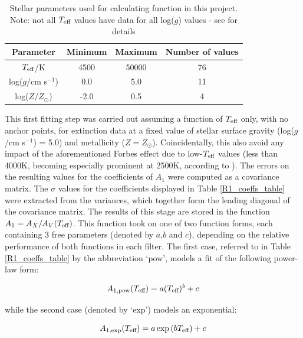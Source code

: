 \documentclass[12pt, a4paper]{report}
\begin{document}
\begin{table}
\begin{tabular}{cccc}
\hline
Parameter & Minimum & Maximum & Number of values\\
\hline
$T_{\textnormal{eff}}$/K & 4500 & 50000 & 76 \\
log($g$/cm s$^{-1}$) & 0.0 & 5.0 & 11 \\
log($Z/Z_{\odot}$) & -2.0 & 0.5 & 4 \\
\hline

\end{tabular}
\caption{Stellar parameters used for calculating function in this project. Note: not all $T_{\textnormal{eff}}$ values have data for all log($g$) values - see \cite{2004astro.ph..5087C} for details}
\label{param_range_table}
\end{table}

This first fitting step was carried out assuming a function of $T_{\textnormal{eff}}$ only, with no anchor points, for  extinction data at a fixed value of stellar surface gravity (log($g$/cm s$^{-1}$) = 5.0) and metallicity ($Z = Z_{\odot}$). Coincidentally, this also avoid any impact of the aforementioned Forbes effect due to low-$T_{\textnormal{eff}}$ values (less than 4000K, becoming especially prominent at 2500K, according to \cite{2008PASP..120..583G}). The errors on the resulting values for the coefficients of $A_{1}$ were computed as a covariance matrix. The $\sigma$ values for the coefficients displayed in Table \ref{R1_coeffs_table} were extracted from the variances, which together form the leading diagonal of the covariance matrix. The results of this stage are stored in the function $A_{1} = A_{X}/A_{V}(T_{\textnormal{eff}})$. This function took on one of two function forms, each containing 3 free parameters (denoted by $a$,$b$ and $c$), depending on the relative performance of both functions in each filter. The first case, referred to in Table \ref{R1_coeffs_table} by the abbreviation `pow', models a fit of the following power-law form:

\begin{equation}
A_{1,\textnormal{pow}} (T_{\textnormal{eff}}) = a (T_{\textnormal{eff}})^{b} + c
\label{Teff_pow}
\end{equation}

while the second case (denoted by `exp') models an exponential:

\begin{equation}
A_{1,\textnormal{exp}} (T_{\textnormal{eff}}) = a \exp{(b T_{\textnormal{eff}})} + c
\label{Teff_exp}
\end{equation}
\end{document}
